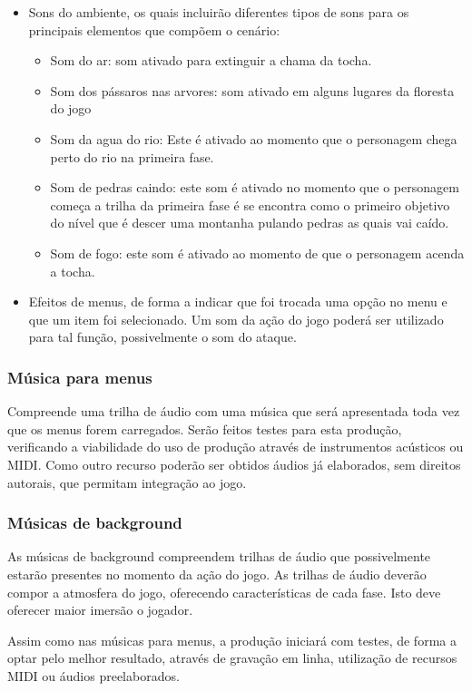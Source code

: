\begin{itemize}
\item Sons do ambiente, os quais incluirão diferentes tipos de sons para os
principais elementos que compõem o cenário:
\begin{itemize}
\item Som do ar: som ativado para extinguir a chama da tocha. 
\item Som dos pássaros nas arvores: som ativado em alguns lugares da floresta 
do jogo 
\item Som da agua do rio: Este é ativado ao momento que o personagem chega 
perto do rio na primeira fase.
\item Som de pedras caindo: este som é ativado no momento que o personagem 
começa a trilha da primeira fase é se encontra como o primeiro objetivo do 
nível que é descer uma montanha pulando pedras as quais vai caído.
\item Som de fogo: este som  é ativado ao momento de que o personagem 
acenda a tocha.
\end{itemize}

\item Efeitos de menus, de forma a indicar que foi trocada uma opção no 
menu e que um item foi selecionado. Um som da ação do jogo poderá ser
 utilizado para tal função, possivelmente o som do ataque.
\end{itemize}

\subsubsection{Música para menus}
Compreende uma trilha de áudio com uma música que será apresentada toda
 vez que os menus forem carregados. Serão feitos testes para esta produção, 
verificando a viabilidade do uso de produção através de instrumentos
 acústicos ou MIDI. Como outro recurso poderão ser obtidos áudios já
 elaborados, sem direitos autorais, que permitam integração ao jogo.

\subsubsection{Músicas de background}
As músicas de background compreendem trilhas de áudio que possivelmente
 estarão presentes no momento da ação do jogo. As trilhas de áudio 
deverão compor a atmosfera do jogo, oferecendo características de 
cada fase. Isto deve oferecer maior imersão o jogador.

Assim como nas músicas para menus, a produção iniciará com testes, de 
forma a optar pelo melhor resultado, através de gravação em linha,
 utilização de recursos MIDI ou áudios preelaborados.
